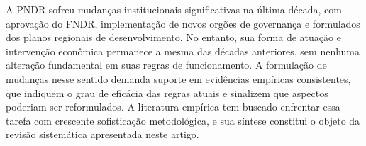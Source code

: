 A PNDR sofreu mudanças institucionais significativas na última década, com aprovação do FNDR, implementação de novos orgões de governança e formulados dos planos regionais de desenvolvimento. No entanto, sua forma de atuação e intervenção econômica permanece a mesma das décadas anteriores, sem nenhuma alteração fundamental em suas regras de funcionamento. A formulação de mudanças nesse sentido demanda suporte em evidências empíricas consistentes, que indiquem o grau de eficácia das regras atuais e sinalizem que aspectos poderiam ser reformulados. A literatura empírica tem buscado enfrentar essa tarefa com crescente sofisticação metodológica, e sua síntese constitui o objeto da revisão sistemática apresentada neste artigo.

